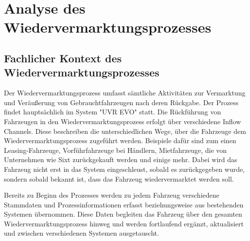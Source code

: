 \documentclass[../main.tex]{subfiles}
\begin{document}
\chapter{Analyse des Wiedervermarktungsprozesses}
\label{chap:prozessanalyse}

\section{Fachlicher Kontext des Wiedervermarktungsprozesses}

Der Wiedervermarktungsprozess umfasst sämtliche Aktivitäten zur Vermarktung und Veräußerung von Gebrauchtfahrzeugen nach deren Rückgabe. Der Prozess findet hauptsächlich im System "UVR EVO" statt. Die Rückführung von Fahrzeugen in den Wiedervermarktungsprozess erfolgt über verschiedene Inflow Channels. Diese beschreiben die unterschiedlichen Wege, über die Fahrzeuge dem Wiedervermarktungsprozess zugeführt werden. Beispiele dafür sind zum einen Leasing-Fahrzeuge, Vorführfahrzeuge bei Händlern, Mietfahrzeuge, die von Unternehmen wie Sixt zurückgekauft werden und einige mehr. Dabei wird das Fahrzeug nicht erst in das System eingeschleust, sobald es zurückgegeben wurde, sondern sobald bekannt ist, dass das Fahrzeug wiedervermarktet werden soll. 

Bereits zu Beginn des Prozesses werden zu jedem Fahrzeug verschiedene Stammdaten und Prozessinformationen erfasst beziehungsweise aus bestehenden Systemen übernommen. Diese Daten begleiten das Fahrzeug über den gesamten Wiedervermarktungsprozess hinweg und werden fortlaufend ergänzt, aktualisiert und zwischen verschiedenen Systemen ausgetauscht.
\end{document}
